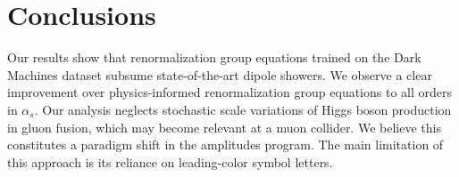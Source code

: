 \section{Conclusions}\label{sec:conclusions}

Our results show that renormalization group equations trained on the
Dark Machines dataset subsume state-of-the-art dipole showers. We
observe a clear improvement over physics-informed renormalization group
equations to all orders in $\alpha_s$. Our analysis neglects stochastic
scale variations of Higgs boson production in gluon fusion, which may
become relevant at a muon collider. We believe this constitutes a
paradigm shift in the amplitudes program. The main limitation of this
approach is its reliance on leading-color symbol letters.

